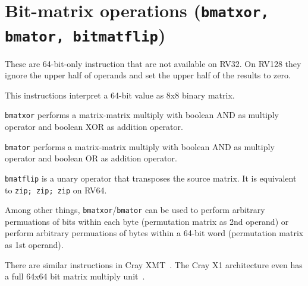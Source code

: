 \section{Bit-matrix operations (\texttt{bmatxor, bmator, bitmatflip})}

These are 64-bit-only instruction that are not available on RV32. On RV128 they
ignore the upper half of operands and set the upper half of the results to zero.

This instructions interpret a 64-bit value as 8x8 binary matrix.

\texttt{bmatxor} performs a matrix-matrix multiply with boolean AND as multiply
operator and boolean XOR as addition operator.

\texttt{bmator} performs a matrix-matrix multiply with boolean AND as multiply
operator and boolean OR as addition operator.

\texttt{bmatflip} is a unary operator that transposes the source matrix. It is
equivalent to \texttt{zip; zip; zip} on RV64.

Among other things, \texttt{bmatxor}/\texttt{bmator} can be used to perform
arbitrary permuations of bits within each byte (permutation matrix as 2nd
operand) or perform arbitrary permuations of bytes within a 64-bit word
(permutation matrix as 1st operand).

There are similar instructions in Cray XMT~\cite{CrayXMT}. The Cray X1
architecture even has a full 64x64 bit matrix multiply unit~\cite{CrayX1}.


